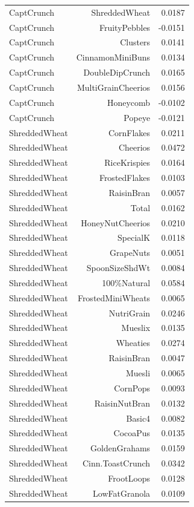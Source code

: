 \begin{longtable}{@{}lrr@{}}
CaptCrunch & ShreddedWheat & 0.0187 \\
CaptCrunch & FruityPebbles & -0.0151 \\
CaptCrunch & Clusters & 0.0141 \\
CaptCrunch & CinnamonMiniBuns & 0.0134 \\
CaptCrunch & DoubleDipCrunch & 0.0165 \\
CaptCrunch & MultiGrainCheerios & 0.0156 \\
CaptCrunch & Honeycomb & -0.0102 \\
CaptCrunch & Popeye & -0.0121 \\
ShreddedWheat & CornFlakes & 0.0211 \\
ShreddedWheat & Cheerios & 0.0472 \\
ShreddedWheat & RiceKrispies & 0.0164 \\
ShreddedWheat & FrostedFlakes & 0.0103 \\
ShreddedWheat & RaisinBran & 0.0057 \\
ShreddedWheat & Total & 0.0162 \\
ShreddedWheat & HoneyNutCheerios & 0.0210 \\
ShreddedWheat & SpecialK & 0.0118 \\
ShreddedWheat & GrapeNuts & 0.0051 \\
ShreddedWheat & SpoonSizeShdWt & 0.0084 \\
ShreddedWheat & 100\%Natural & 0.0584 \\
ShreddedWheat & FrostedMiniWheats & 0.0065 \\
ShreddedWheat & NutriGrain & 0.0246 \\
ShreddedWheat & Mueslix & 0.0135 \\
ShreddedWheat & Wheaties & 0.0274 \\
ShreddedWheat & RaisinBran & 0.0047 \\
ShreddedWheat & Muesli & 0.0065 \\
ShreddedWheat & CornPops & 0.0093 \\
ShreddedWheat & RaisinNutBran & 0.0132 \\
ShreddedWheat & Basic4 & 0.0082 \\
ShreddedWheat & CocoaPus & 0.0135 \\
ShreddedWheat & GoldenGrahams & 0.0159 \\
ShreddedWheat & Cinn.ToastCrunch & 0.0342 \\
ShreddedWheat & FrootLoops & 0.0128 \\
ShreddedWheat & LowFatGranola & 0.0109 \\

\end{longtable}
